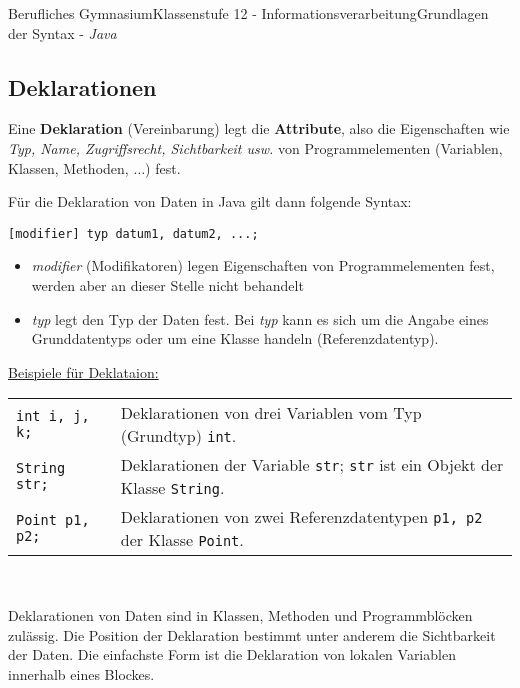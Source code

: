 \documentclass[11pt,oneside,openany,headings=optiontotoc,11pt,numbers=noenddot]{article}
\begin{document}
\begin{worksheet}{Berufliches Gymnasium}{Klassenstufe 12 - Informationsverarbeitung}{Grundlagen der Syntax - \textit{Java}}
		\subsection{Deklarationen}
		Eine \textbf{Deklaration} (Vereinbarung) legt die \textbf{Attribute}, also die Eigenschaften wie \textit{Typ, Name, Zugriffsrecht, Sichtbarkeit usw.} von Programmelementen (Variablen, Klassen, Methoden, $\ldots$) fest.\\
		\par\noindent
		Für die Deklaration von Daten in Java gilt dann folgende Syntax:
		\begin{lstlisting}[style=JavaInputStyle]
			[modifier] typ datum1, datum2, ...;
		\end{lstlisting}
		\begin{itemize}
			\item \textit{modifier} (Modifikatoren) legen Eigenschaften von Programmelementen fest, werden aber an dieser Stelle nicht behandelt
			\item \textit{typ} legt den Typ der Daten fest. Bei \textit{typ} kann es sich um die Angabe eines Grunddatentyps oder um eine Klasse handeln (Referenzdatentyp).
		\end{itemize}
		\underline{Beispiele für Deklataion:}\\
		\begin{tabularx}{\textwidth}{lX}
			{\lstinline[style=JavaInputStyle]|int i, j, k;|} & Deklarationen von drei Variablen vom Typ (Grundtyp) {\lstinline[style=JavaInputStyle]|int|}.\\
			{\lstinline[style=JavaInputStyle]|String str;|} & Deklarationen der Variable {\lstinline[style=JavaInputStyle]|str|}; {\lstinline[style=JavaInputStyle]|str|} ist ein Objekt der Klasse {\lstinline[style=JavaInputStyle]|String|}.\\
			{\lstinline[style=JavaInputStyle]|Point p1, p2;|} & Deklarationen von zwei Referenzdatentypen {\lstinline[style=JavaInputStyle]|p1, p2|} der Klasse {\lstinline[style=JavaInputStyle]|Point|}.\\
		\end{tabularx}\\
		\par\noindent
		Deklarationen von Daten sind in Klassen, Methoden und Programmblöcken zulässig. Die Position der Deklaration bestimmt unter anderem die Sichtbarkeit der Daten. Die einfachste Form ist die Deklaration von lokalen Variablen innerhalb eines Blockes.

\end{worksheet}
\end{document}

